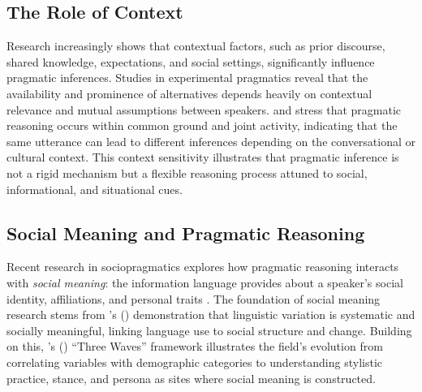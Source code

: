 \documentclass[12pt,a4paper]{article}
\begin{document}
\subsection{The Role of Context}

Research increasingly shows that contextual factors, such as prior discourse,
shared knowledge, expectations, and social settings, significantly influence
pragmatic inferences. Studies in experimental pragmatics
\citep[e.g.,][]{BrehenyKatsosWilliams2006,DegenTanenhaus2015} reveal that the
availability and prominence of alternatives depends heavily on contextual
relevance and mutual assumptions between speakers. \citet{vanRooij2003} and
\citet{Clark1996} stress that pragmatic reasoning occurs within common ground
and joint activity, indicating that the same utterance can lead to different
inferences depending on the conversational or cultural context. This context
sensitivity illustrates that pragmatic inference is not a rigid mechanism but a
flexible reasoning process attuned to social, informational, and situational
cues.

\subsection{Social Meaning and Pragmatic Reasoning}

Recent research in sociopragmatics explores how pragmatic reasoning interacts
with \emph{social meaning}: the information language provides about a speaker's
social identity, affiliations, and personal traits \citep{Eckert2008,Podesva2011,Silverstein2003}. 
The foundation of social meaning research stems from \citeauthor{Labov1972}'s
(\citeyear{Labov1972}) demonstration that linguistic variation is systematic and
socially meaningful, linking language use to social structure and change. Building
on this, \citeauthor{Eckert2012}'s (\citeyear{Eckert2012}) ``Three Waves''
framework illustrates the field's evolution from correlating variables with
demographic categories to understanding stylistic practice, stance, and persona
as sites where social meaning is constructed.
\end{document}
